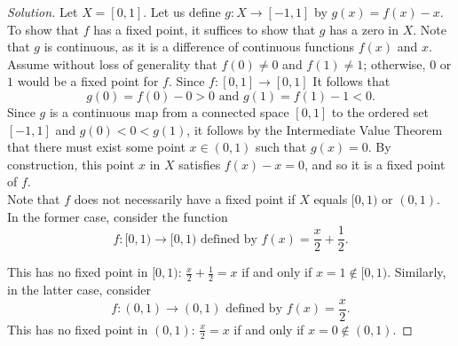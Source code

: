 \documentclass[11pt]{article}
\newenvironment{solution}
  {\renewcommand\qedsymbol{$\blacksquare$}\begin{proof}[Solution]}
  {\end{proof}}
\begin{document}
\begin{solution}
Let $X = [0, 1]$. Let us define $g\colon X \rightarrow [-1, 1]$ by $g(x) = f(x) - x$. To show that $f$ has a fixed point, it suffices to show that $g$ has a zero in $X$. 
Note that $g$ is continuous, as it is a difference of continuous functions $f(x)$ and $x$. \\

Assume without loss of generality that $f(0) \neq 0$ and $f(1) \neq 1$; otherwise, $0$ or $1$ would be a fixed point for $f$. 
Since $f\colon [0, 1] \rightarrow [0, 1]$ It follows that
\[
	g(0) = f(0) - 0 > 0 \text{ and } g(1) = f(1) - 1 < 0.
\]
Since $g$ is a continuous map from a connected space $[0, 1]$ to the ordered set $[-1, 1]$ and $g(0) < 0 < g(1)$, 
it follows by the Intermediate Value Theorem that there must exist some point $x \in (0, 1)$ such that $g(x) = 0$. 
By construction, this point $x$ in $X$ satisfies $f(x) - x = 0$, and so it is a fixed point of $f$. \\

Note that $f$ does not necessarily have a fixed point if $X$ equals $[0, 1)$ or $(0, 1)$. In the former case, consider the function
\[
	f\colon [0, 1) \rightarrow [0, 1) \text{ defined by } f(x) = \frac{x}{2} + \frac{1}{2}.
\]

This has no fixed point in $[0, 1)$: $\frac{x}{2} + \frac{1}{2} = x$ if and only if $x = 1 \notin [0, 1)$. Similarly, 
in the latter case, consider
\[
	f\colon (0, 1) \rightarrow (0,1) \text{ defined by } f(x) = \frac{x}{2}.
\]
This has no fixed point in $(0, 1)$: $\frac{x}{2} = x$ if and only if $x = 0 \notin (0, 1)$. 
\end{solution}
\end{document}
